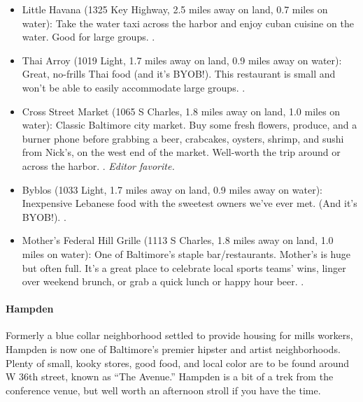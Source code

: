 \begin{itemize}
\item{Little Havana (1325 Key Highway, 2.5 miles away on land, 0.7 miles on water): Take the water taxi across the harbor and enjoy cuban cuisine on the water. Good for large groups. \postdoc.}
\item{Thai Arroy (1019 Light, 1.7 miles away on land, 0.9 miles away on water): Great, no-frills Thai food (and it's BYOB!). This restaurant is small and won't be able to easily accommodate large groups. \postdoc.}
\item{Cross Street Market (1065 S Charles, 1.8 miles away on land, 1.0 miles on water): Classic Baltimore city market. Buy some fresh flowers, produce, and a burner phone before grabbing a beer, crabcakes, oysters, shrimp, and sushi from Nick's, on the west end of the market. Well-worth the trip around or across the harbor. \gradstudent. \it{Editor favorite}.}
\item{Byblos (1033 Light, 1.7 miles away on land, 0.9 miles away on water): Inexpensive Lebanese food with the sweetest owners we've ever met. (And it's BYOB!). \gradstudent.}
\item{Mother's Federal Hill Grille (1113 S Charles, 1.8 miles away on land, 1.0 miles on water): One of Baltimore's staple bar/restaurants. Mother's is huge but often full. It's a great place to celebrate local sports teams' wins, linger over weekend brunch, or grab a quick lunch or happy hour beer. \postdoc.}
\end{itemize}

\paragraph*{Hampden}
Formerly a blue collar neighborhood settled to provide housing for mills workers, Hampden is now one of Baltimore's premier hipster and artist neighborhoods. Plenty of small, kooky stores, good food, and local color are to be found around W 36th street, known as ``The Avenue.'' Hampden is a bit of a trek from the conference venue, but well worth an afternoon stroll if you have the time.

